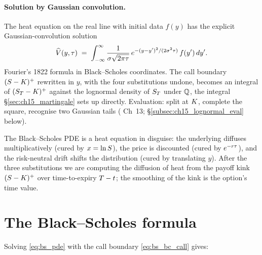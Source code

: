 \paragraph{Solution by Gaussian convolution.}
The heat equation on the real line with initial data $f(y)$ has
the explicit Gaussian-convolution solution
\begin{equation}
  \widehat V(y, \tau)
  \;=\; \int_{-\infty}^{\infty}
        \frac{1}{\sigma\sqrt{2\pi\tau}}\,
        e^{-(y - y')^2/(2\sigma^2 \tau)}\,
        f(y')\,dy'.
  \label{eq:gaussian_convolution}
\end{equation}
Fourier's 1822 formula in Black--Scholes coordinates. The call
boundary $(S - K)^+$ rewritten in $y$, with the four
substitutions undone, becomes an integral of
$(S_T - K)^+$ against the lognormal density of
$S_T$ under $\mathbb{Q}$, the integral
\S\ref{sec:ch15_martingale} sets up directly. Evaluation:
split at $K$, complete the square, recognise two
Gaussian tails (\citeHull{} Ch~13;
\S\ref{subsec:ch15_lognormal_eval} below).

\begin{intuitionbox}
The Black--Scholes PDE is a heat equation in disguise: the
underlying diffuses multiplicatively (cured by $x = \ln S$),
the price is discounted (cured by $e^{-r\tau}$), and the
risk-neutral drift shifts the distribution (cured by
translating $y$). After the three substitutions we are
computing the diffusion of heat from the payoff kink
$(S - K)^+$ over time-to-expiry $T - t$; the
smoothing of the kink is the option's time value.
\end{intuitionbox}

\section{The Black--Scholes formula}
\label{sec:ch15_formula}

Solving \eqref{eq:bs_pde} with the call boundary
\eqref{eq:bs_bc_call} gives:

